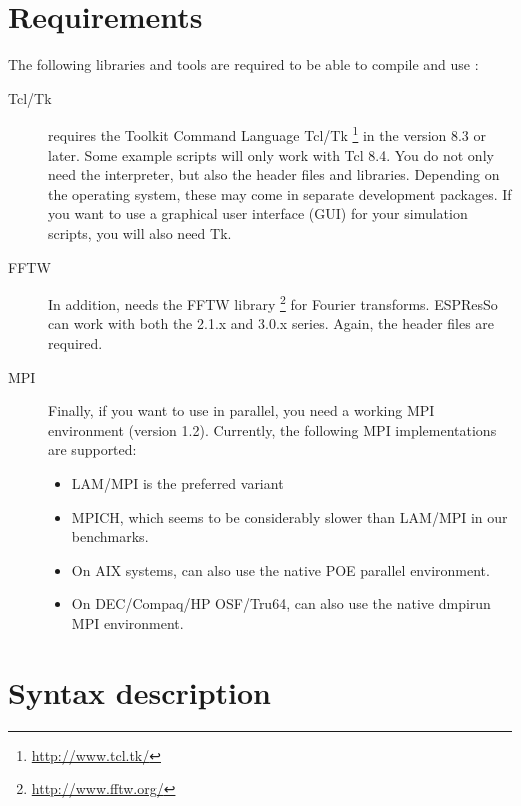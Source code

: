 \section{Requirements}
\label{sec:requirements}

The following libraries and tools are required to be able to compile
and use \es:

\begin{description}
\item[Tcl/Tk]  \es{} requires the Toolkit Command
  Language Tcl/Tk \footnote{\url{http://www.tcl.tk/}} in the version
  8.3 or later.  Some example scripts will only work with Tcl 8.4. You
  do not only need the interpreter, but also the header files and
  libraries.  Depending on the operating system, these may come in
  separate development packages. If you want to use a graphical user
  interface (GUI) for your simulation scripts, you will also need Tk.
  
\item[FFTW]  In addition, \es{} needs the FFTW library
  \footnote{\url{http://www.fftw.org/}} for Fourier transforms.
  ESPResSo can work with both the 2.1.x and 3.0.x series. Again, the
  header files are required.
  
\item[MPI]  Finally, if you want to use \es{} in parallel,
  you need a working MPI environment (version 1.2). Currently, the
  following MPI implementations are supported:
  \begin{itemize}
  \item LAM/MPI is the preferred variant
  \item MPICH, which seems to be considerably slower than LAM/MPI in
    our benchmarks.
  \item On AIX systems, \es{} can also use the native POE parallel
    environment.
  \item On DEC/Compaq/HP OSF/Tru64, \es{} can also use the native
    dmpirun MPI environment.
  \end{itemize}
\end{description}


\section{Syntax description}
\label{sec:syntax}

